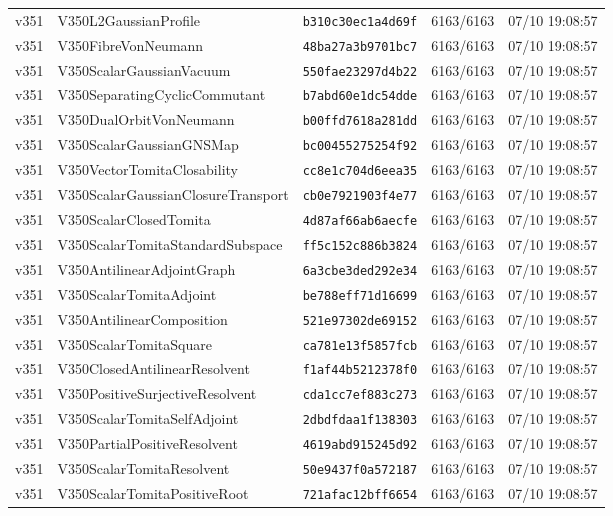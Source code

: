 \documentclass[11pt]{article}
\theoremstyle{definition}\newtheorem{deriv}{Derivação}
\begin{document}
{\begin{longtable}{@{}lllll@{}}
v351 & V350L2GaussianProfile & \texttt{b310c30ec1a4d69f} & 6163/6163 & 07/10 19:08:57 \\
v351 & V350FibreVonNeumann & \texttt{48ba27a3b9701bc7} & 6163/6163 & 07/10 19:08:57 \\
v351 & V350ScalarGaussianVacuum & \texttt{550fae23297d4b22} & 6163/6163 & 07/10 19:08:57 \\
v351 & V350SeparatingCyclicCommutant & \texttt{b7abd60e1dc54dde} & 6163/6163 & 07/10 19:08:57 \\
v351 & V350DualOrbitVonNeumann & \texttt{b00ffd7618a281dd} & 6163/6163 & 07/10 19:08:57 \\
v351 & V350ScalarGaussianGNSMap & \texttt{bc00455275254f92} & 6163/6163 & 07/10 19:08:57 \\
v351 & V350VectorTomitaClosability & \texttt{cc8e1c704d6eea35} & 6163/6163 & 07/10 19:08:57 \\
v351 & V350ScalarGaussianClosureTransport & \texttt{cb0e7921903f4e77} & 6163/6163 & 07/10 19:08:57 \\
v351 & V350ScalarClosedTomita & \texttt{4d87af66ab6aecfe} & 6163/6163 & 07/10 19:08:57 \\
v351 & V350ScalarTomitaStandardSubspace & \texttt{ff5c152c886b3824} & 6163/6163 & 07/10 19:08:57 \\
v351 & V350AntilinearAdjointGraph & \texttt{6a3cbe3ded292e34} & 6163/6163 & 07/10 19:08:57 \\
v351 & V350ScalarTomitaAdjoint & \texttt{be788eff71d16699} & 6163/6163 & 07/10 19:08:57 \\
v351 & V350AntilinearComposition & \texttt{521e97302de69152} & 6163/6163 & 07/10 19:08:57 \\
v351 & V350ScalarTomitaSquare & \texttt{ca781e13f5857fcb} & 6163/6163 & 07/10 19:08:57 \\
v351 & V350ClosedAntilinearResolvent & \texttt{f1af44b5212378f0} & 6163/6163 & 07/10 19:08:57 \\
v351 & V350PositiveSurjectiveResolvent & \texttt{cda1cc7ef883c273} & 6163/6163 & 07/10 19:08:57 \\
v351 & V350ScalarTomitaSelfAdjoint & \texttt{2dbdfdaa1f138303} & 6163/6163 & 07/10 19:08:57 \\
v351 & V350PartialPositiveResolvent & \texttt{4619abd915245d92} & 6163/6163 & 07/10 19:08:57 \\
v351 & V350ScalarTomitaResolvent & \texttt{50e9437f0a572187} & 6163/6163 & 07/10 19:08:57 \\
v351 & V350ScalarTomitaPositiveRoot & \texttt{721afac12bff6654} & 6163/6163 & 07/10 19:08:57 \\

\end{longtable}}
\end{document}
